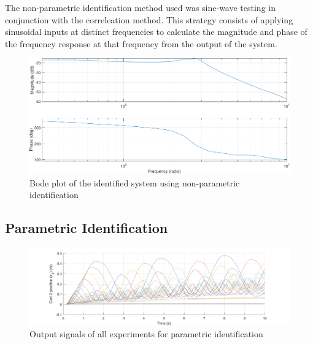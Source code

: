 \documentclass[11pt]{article}
\begin{document}
The non-parametric identification method used was sine-wave testing in conjunction with the correleation method. This strategy consists of applying sinusoidal inputs at distinct frequencies to calculate the magnitude and phase of the frequency response at that frequency from the output of the system.

\begin{figure}[!ht]
\centering
\includegraphics[width=\textwidth]{bodeid-corr.pdf}
\caption{Bode plot of the identified system using non-parametric identification}
\label{fig:bodeid_corr}
\end{figure}


\subsection{Parametric Identification}


\begin{figure}[!ht]
\centering
\includegraphics[width=\textwidth]{sysid-outputs.pdf}
\caption{Output signals of all experiments for parametric identification}
\label{fig:outputs-param}
\end{figure}
\end{document}
